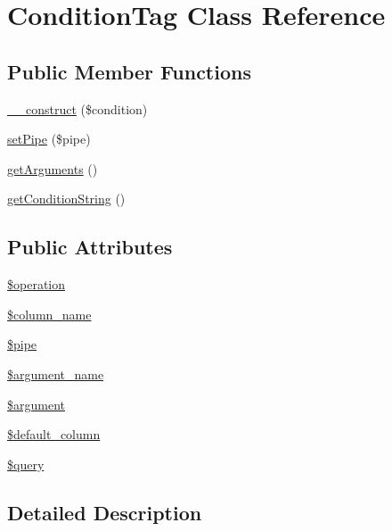 \hypertarget{classConditionTag}{\section{Condition\-Tag Class Reference}
\label{classConditionTag}
}
\subsection*{Public Member Functions}
\begin{DoxyCompactItemize}
\item 
\hyperlink{classConditionTag_ada72d296ff73d23958307da89ed03794}{\-\_\-\-\_\-construct} (\$condition)
\item 
\hyperlink{classConditionTag_a7bc5d3d0fe4eef67d1338e67d9ad987e}{set\-Pipe} (\$pipe)
\item 
\hyperlink{classConditionTag_ad9c04c50390c7394e66a565e9afa456a}{get\-Arguments} ()
\item 
\hyperlink{classConditionTag_a0ba99a5ac27c8051ddf617306a89fadf}{get\-Condition\-String} ()
\end{DoxyCompactItemize}
\subsection*{Public Attributes}
\begin{DoxyCompactItemize}
\item 
\hyperlink{classConditionTag_a0f8be8743e1e43b334ee1b46d25fd02e}{\$operation}
\item 
\hyperlink{classConditionTag_a75d63b235f269dd4c12b3893fd456c10}{\$column\-\_\-name}
\item 
\hyperlink{classConditionTag_a52a8251ff965af25e284262fab02f7f5}{\$pipe}
\item 
\hyperlink{classConditionTag_a21ac5db76c722e4a9bc767d675bcc0c1}{\$argument\-\_\-name}
\item 
\hyperlink{classConditionTag_aa2252e2278122e41b623b0740ff499b3}{\$argument}
\item 
\hyperlink{classConditionTag_ac401b3684262dd2a0ff53ff9a97864fe}{\$default\-\_\-column}
\item 
\hyperlink{classConditionTag_ab186510e6366ad1033cc9d73cedf1f02}{\$query}
\end{DoxyCompactItemize}


\subsection{Detailed Description}


